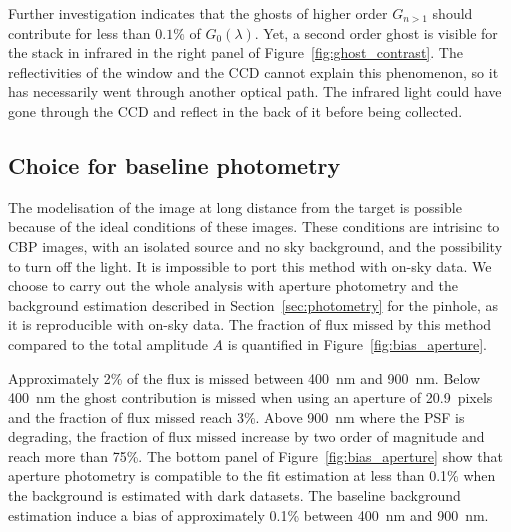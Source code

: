 Further investigation indicates that the ghosts of higher order $G_{n>1}$ should contribute for less than $0.1\%$ of $G_0(\lambda)$. Yet, a second order ghost is visible for the stack in infrared in the right panel of Figure~\ref{fig:ghost_contrast}. The reflectivities of the window and the CCD cannot explain this phenomenon, so it has necessarily went through another optical path. The infrared light could have gone through the CCD and reflect in the back of it before being collected.

\subsection{Choice for baseline photometry}

%
%
%
%

The modelisation of the image at long distance from the target is possible because of the ideal conditions of these images. These conditions are intrisinc to CBP images, with an isolated source and no sky background, and the possibility to turn off the light. It is impossible to port this method with on-sky data. We choose to carry out the whole analysis with aperture photometry and the background estimation described in Section~\ref{sec:photometry} for the \spinhole pinhole, as it is reproducible with on-sky data. The fraction of flux missed by this method compared to the total amplitude $A$ is quantified in Figure~\ref{fig:bias_aperture}. 

Approximately 2\% of the flux is missed between \SI{400}{\nano\meter} and \SI{900}{\nano\meter}. Below \SI{400}{\nano\meter} the ghost contribution is missed when using an aperture of \SI{20.9}{pixels} and the fraction of flux missed reach 3\%. Above \SI{900}{\nano\meter} where the PSF is degrading, the fraction of flux missed increase by two order of magnitude and reach more than 75\%. The bottom panel of Figure~\ref{fig:bias_aperture} show that aperture photometry is compatible to the fit estimation at less than 0.1\% when the background is estimated with dark datasets. The baseline background estimation induce a bias of approximately 0.1\% between \SI{400}{\nano\meter} and \SI{900}{\nano\meter}.


